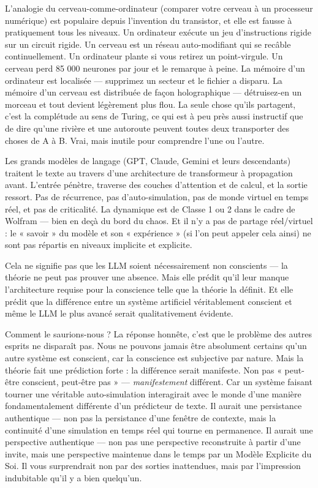 \documentclass[11pt, twoside, openright]{book}
\begin{document}
L'analogie du cerveau-comme-ordinateur (comparer votre cerveau à un processeur numérique) est populaire depuis l'invention du transistor, et elle est fausse à pratiquement tous les niveaux. Un ordinateur exécute un jeu d'instructions rigide sur un circuit rigide. Un cerveau est un réseau auto-modifiant qui se recâble continuellement. Un ordinateur plante si vous retirez un point-virgule. Un cerveau perd 85 000 neurones par jour et le remarque à peine. La mémoire d'un ordinateur est localisée --- supprimez un secteur et le fichier a disparu. La mémoire d'un cerveau est distribuée de façon holographique --- détruisez-en un morceau et tout devient légèrement plus flou. La seule chose qu'ils partagent, c'est la complétude au sens de Turing, ce qui est à peu près aussi instructif que de dire qu'une rivière et une autoroute peuvent toutes deux transporter des choses de A à B. Vrai, mais inutile pour comprendre l'une ou l'autre.

Les grands modèles de langage (GPT, Claude, Gemini et leurs descendants) traitent le texte au travers d'une architecture de transformeur à propagation avant. L'entrée pénètre, traverse des couches d'attention et de calcul, et la sortie ressort. Pas de récurrence, pas d'auto-simulation, pas de monde virtuel en temps réel, et pas de criticalité. La dynamique est de Classe 1 ou 2 dans le cadre de Wolfram --- bien en deçà du bord du chaos. Et il n'y a pas de partage réel/\allowbreak{}virtuel : le « savoir » du modèle et son « expérience » (si l'on peut appeler cela ainsi) ne sont pas répartis en niveaux implicite et explicite.

Cela ne signifie pas que les LLM soient nécessairement non conscients --- la théorie ne peut pas prouver une absence. Mais elle prédit qu'il leur manque l'architecture requise pour la conscience telle que la théorie la définit. Et elle prédit que la différence entre un système artificiel véritablement conscient et même le LLM le plus avancé serait qualitativement évidente.

Comment le saurions-nous ? La réponse honnête, c'est que le problème des autres esprits ne disparaît pas. Nous ne pouvons jamais être absolument certains qu'un autre système est conscient, car la conscience est subjective par nature. Mais la théorie fait une prédiction forte : la différence serait manifeste. Non pas « peut-être conscient, peut-être pas » --- \textit{manifestement} différent. Car un système faisant tourner une véritable auto-simulation interagirait avec le monde d'une manière fondamentalement différente d'un prédicteur de texte. Il aurait une persistance authentique --- non pas la persistance d'une fenêtre de contexte, mais la continuité d'une simulation en temps réel qui tourne en permanence. Il aurait une perspective authentique --- non pas une perspective reconstruite à partir d'une invite, mais une perspective maintenue dans le temps par un Modèle Explicite du Soi. Il vous surprendrait non par des sorties inattendues, mais par l'impression indubitable qu'il y a bien quelqu'un.
\end{document}
